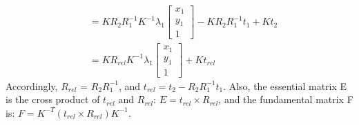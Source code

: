 \begin{your_solution}[title=Q1.3,height=17cm,width=\linewidth]
\begin{equation}
\begin{split}
	 &= K R_2 R_1^{-1} K^{-1} \lambda_1 \begin{bmatrix} x_1 \\ y_1 \\ 1 \end{bmatrix} - K R_2 R_1^{-1} t_1 + K t_2 \\
	 &= K R_{rel} K^{-1} \lambda_1 \begin{bmatrix} x_1 \\ y_1 \\ 1 \end{bmatrix} + K t_{rel}
\end{split}
\end{equation}
Accordingly, $R_{rel}$ = $R_2 R_1^{-1}$, and $t_{rel} = t_2 - R_2 R_1^{-1} t_1$. Also, the essential matrix E is the cross product of $t_{rel}$ and $R_{rel}$: $E = t_{rel} \times R_{rel}$, and the fundamental matrix F is: $F = K^{-T}(t_{rel} \times R_{rel}) K^{-1}$.


\end{your_solution}